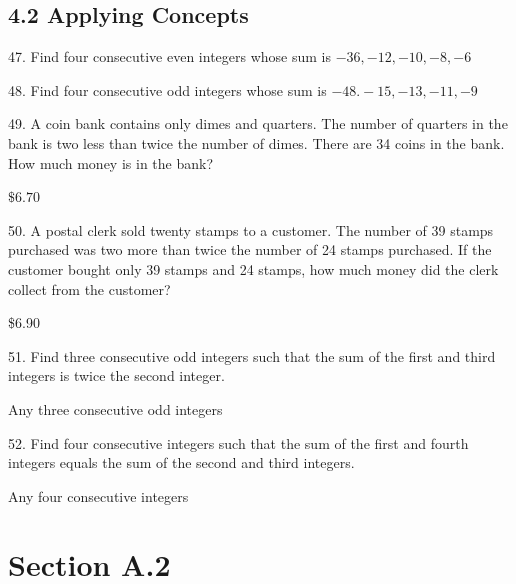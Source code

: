 \documentclass{ximera}
\begin{document}
\subsection*{4.2 Applying Concepts}

\begin{exercise}
47. Find four consecutive even integers whose sum is $-36,-12,-10,-8,-6$
\end{exercise}

\begin{exercise}
48. Find four consecutive odd integers whose sum is $-48 .-15,-13,-11,-9$
\end{exercise}

\begin{exercise}
49. A coin bank contains only dimes and quarters. The number of quarters in the bank is two less than twice the number of dimes. There are 34 coins in the bank. How much money is in the bank?
\begin{solution}
$\$ 6.70$
\end{solution}
\end{exercise}

\begin{exercise}
50. A postal clerk sold twenty stamps to a customer. The number of 39\textcent{} stamps purchased was two more than twice the number of 24\textcent{} stamps purchased. If the customer bought only 39\textcent{} stamps and 24\textcent{} stamps, how much money did the clerk collect from the customer?
\begin{solution}
\$6.90
\end{solution}
\end{exercise}

\begin{exercise}
51. Find three consecutive odd integers such that the sum of the first and third integers is twice the second integer.
\begin{solution}
Any three consecutive odd integers
\end{solution}
\end{exercise}

\begin{exercise}
52. Find four consecutive integers such that the sum of the first and fourth integers equals the sum of the second and third integers.
\begin{solution}
Any four consecutive integers
\end{solution}
\end{exercise}

\section*{Section A.2}
\end{document}
